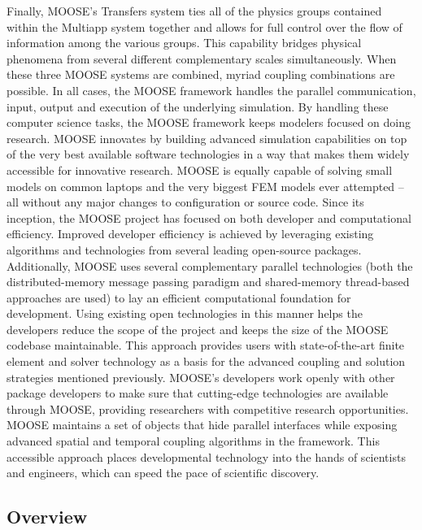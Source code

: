 \documentclass{INLreport}
\begin{document}
Finally, MOOSE’s Transfers system ties all of the physics groups contained within the Multiapp system together and allows for
full control over the flow of information among the various groups. This capability bridges physical phenomena from several
different complementary scales simultaneously. When these three MOOSE systems are combined, myriad coupling combinations are
possible. In all cases, the MOOSE framework handles the parallel communication, input, output and execution of the underlying
simulation. By handling these computer science tasks, the MOOSE framework keeps modelers focused on doing research. MOOSE
innovates by building advanced simulation capabilities on top of the very best available software technologies in a way that
makes them widely accessible for innovative research. MOOSE is equally capable of solving small models on common laptops and
the very biggest FEM models ever attempted -- all without any major changes to configuration or source code. Since its
inception, the MOOSE project has focused on both developer and computational efficiency. Improved developer efficiency is
achieved by leveraging existing algorithms and technologies from several leading open-source packages. Additionally, MOOSE uses
several complementary parallel technologies (both the distributed-memory message passing paradigm and shared-memory thread-based
approaches are used) to lay an efficient computational foundation for development. Using existing open technologies in this
manner helps the developers reduce the scope of the project and keeps the size of the MOOSE codebase maintainable. This approach
provides users with state-of-the-art finite element and solver technology as a basis for the advanced coupling and solution
strategies mentioned previously. MOOSE’s developers work openly with other package developers to make sure that cutting-edge
technologies are available through MOOSE, providing researchers with competitive research opportunities. MOOSE maintains a set
of objects that hide parallel interfaces while exposing advanced spatial and temporal coupling algorithms in the framework.
This accessible approach places developmental technology into the hands of scientists and engineers, which can speed the pace of
scientific discovery.

\subsection{Overview}
\end{document}
